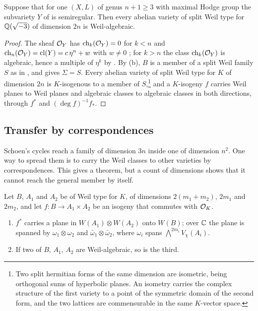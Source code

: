 \begin{corollary}\label{cor:schoensemireg}
Suppose that for one $(X,L)$ of genus $n+1\ge3$ with maximal Hodge group the
subvariety $Y$ of  is semiregular. Then every abelian variety of
split Weil type for $\mathbb{Q}(\sqrt{-3})$ of dimension $2n$ is Weil-algebraic.
\end{corollary}

\begin{proof}
The sheaf $\mathcal{O}_{Y}$ has $\operatorname{ch}_{k}(\mathcal{O}_{Y})=0$ for $k<n$ and $\operatorname{ch}_{n}(\mathcal{O}_{Y})=
\operatorname{cl}(Y)=c\,\eta^{n}+w$ with $w\ne0$ \cite[Chapter~15]{Ful98}; for $k>n$ the
class $\operatorname{ch}_{k}(\mathcal{O}_{Y})$ is algebraic, hence a multiple of $\eta^{k}$ by
. By (b), $B$ is a member of a split
Weil family $S$ as in , and 
gives $\Sigma=S$. Every abelian variety of split Weil type for $K$ of
dimension $2n$ is $K$-isogenous to a member of $S$,\footnote{Two split
hermitian forms of the same dimension are isometric, being orthogonal sums
of hyperbolic planes. An isometry carries the complex structure of the
first variety to a point of the symmetric domain of the second form, and
the two lattices are commensurable in the same $K$-vector space.} and a
$K$-isogeny $f$ carries Weil planes to Weil planes and algebraic classes to
algebraic classes in both directions, through $f^{*}$ and
$(\deg f)^{-1}f_{*}$.
\end{proof}

\subsection{Transfer by correspondences}\label{ssec:transfer}
Schoen's cycles reach a family of dimension $3n$ inside one of dimension
$n^{2}$. One way to spread them is to carry the Weil classes to other
varieties by correspondences. This gives a theorem, but a count of
dimensions shows that it cannot reach the general member by itself.

\begin{lemma}\label{lem:twothree}
Let $B$, $A_{1}$ and $A_{2}$ be of Weil type for $K$, of dimensions
$2(m_{1}+m_{2})$, $2m_{1}$ and $2m_{2}$, and let $f\colon B\to A_{1}\times
A_{2}$ be an isogeny that commutes with $\mathcal{O}_{K}$.
\begin{enumerate}[label=\textup{(\alph*)}]
\item $f^{*}$ carries a plane in $W(A_{1})\otimes W(A_{2})$ onto $W(B)$;
over $\mathbb{C}$ the plane is spanned by $\omega_{1}\otimes\omega_{2}$ and
$\bar\omega_{1}\otimes\bar\omega_{2}$, where $\omega_{i}$ spans
$\bigwedge^{2m_{i}}V_{\chi}(A_{i})$.
\item If two of $B$, $A_{1}$, $A_{2}$ are Weil-algebraic, so is the third.
\end{enumerate}
\end{lemma}

